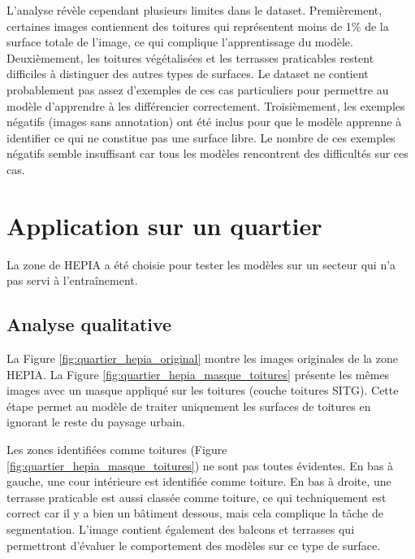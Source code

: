 L'analyse révèle cependant plusieurs limites dans le dataset. Premièrement, certaines images contiennent des toitures qui représentent moins de 1\% de la surface totale de l'image, ce qui complique l'apprentissage du modèle. Deuxièmement, les toitures végétalisées et les terrasses praticables restent difficiles à distinguer des autres types de surfaces. Le dataset ne contient probablement pas assez d'exemples de ces cas particuliers pour permettre au modèle d'apprendre à les différencier correctement. Troisièmement, les exemples négatifs (images sans annotation) ont été inclus pour que le modèle apprenne à identifier ce qui ne constitue pas une surface libre. Le nombre de ces exemples négatifs semble insuffisant car tous les modèles rencontrent des difficultés sur ces cas.

\section{Application sur un quartier}
La zone de HEPIA a été choisie pour tester les modèles sur un secteur qui n'a pas servi à l'entraînement.

\subsection{Analyse qualitative}
La Figure \ref{fig:quartier_hepia_original} montre les images originales de la zone HEPIA. La Figure \ref{fig:quartier_hepia_masque_toitures} présente les mêmes images avec un masque appliqué sur les toitures (couche toitures SITG). Cette étape permet au modèle de traiter uniquement les surfaces de toitures en ignorant le reste du paysage urbain.

Les zones identifiées comme toitures (Figure \ref{fig:quartier_hepia_masque_toitures}) ne sont pas toutes évidentes. En bas à gauche, une cour intérieure est identifiée comme toiture. En bas à droite, une terrasse praticable est aussi classée comme toiture, ce qui techniquement est correct car il y a bien un bâtiment dessous, mais cela complique la tâche de segmentation. L'image contient également des balcons et terrasses qui permettront d'évaluer le comportement des modèles sur ce type de surface.

